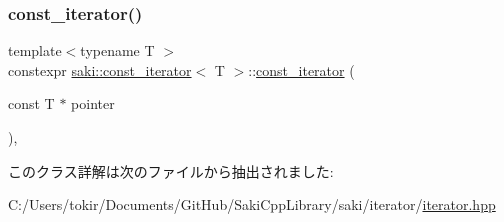 \subsubsection{\texorpdfstring{const\+\_\+iterator()}{const\_iterator()}}
{\footnotesize\ttfamily template$<$typename T $>$ \\
constexpr \mbox{\hyperlink{classsaki_1_1const__iterator}{saki\+::const\+\_\+iterator}}$<$ T $>$\+::\mbox{\hyperlink{classsaki_1_1const__iterator}{const\+\_\+iterator}} (\begin{DoxyParamCaption}\item[{const T $\ast$}]{pointer }\end{DoxyParamCaption})\hspace{0.3cm}{\ttfamily [inline]}, {\ttfamily [explicit]}}



このクラス詳解は次のファイルから抽出されました\+:\begin{DoxyCompactItemize}
\item 
C\+:/\+Users/tokir/\+Documents/\+Git\+Hub/\+Saki\+Cpp\+Library/saki/iterator/\mbox{\hyperlink{iterator_2iterator_8hpp}{iterator.\+hpp}}\end{DoxyCompactItemize}
